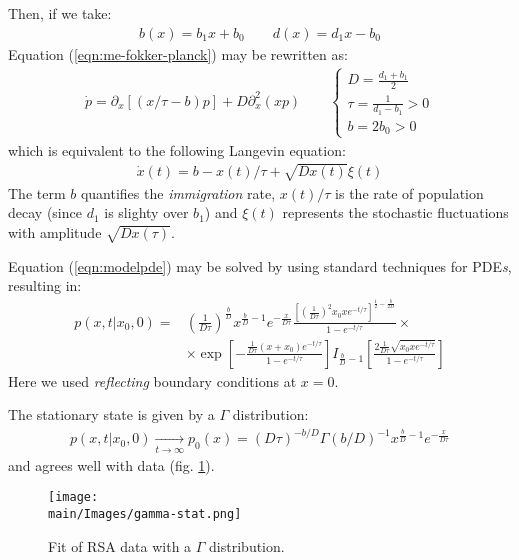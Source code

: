 \documentclass[../../main.tex]{subfiles}
\begin{document}
Then, if we take:
\begin{align*}
    b(x) = b_1 x + b_0\qquad d(x) = d_1 x - b_0
\end{align*}
Equation (\ref{eqn:me-fokker-planck}) may be rewritten as:
\begin{align}\label{eqn:modelpde}
    \dot{p} = \partial_x[(x/\tau - b)p] + D\partial_x^2 (xp) \qquad \begin{cases}
        D = \frac{d_1 + b_1}{2}\\
        \tau = \frac{1}{d_1 - b_1} > 0\\
        b = 2b_0 > 0  
    \end{cases}
\end{align}
which is equivalent to the following Langevin equation:
\begin{align*}
    \dot{x}(t) = b - x(t)/\tau + \sqrt{D x(t)} \xi(t)
\end{align*}
The term $b$ quantifies the \textit{immigration} rate, $x(t)/\tau$ is the rate of population decay (since $d_1$ is slighty over $b_1$) and $\xi(t)$ represents the stochastic fluctuations with amplitude $\sqrt{D x(\tau)}$.

\medskip

Equation (\ref{eqn:modelpde}) may be solved by using standard techniques for PDE\textit{s}, resulting in:
\begin{align*}
    p(x, t | x_{0}, 0) = &\left(\frac{1}{D \tau}\right)^{\frac{b}{D}} x^{\frac{b}{D}-1} e^{-\frac{x}{D \tau}} \frac{\left[\left(\frac{1}{D \tau}\right)^{2} x_{0} x e^{-t / \tau}\right]^{\frac{1}{2}-\frac{b}{2 D}}}{1-e^{-t / \tau}} \times \\
    & \times \exp \left[-\frac{\frac{1}{D \tau}\left(x+x_{0}\right) e^{-t / \tau}}{1-e^{-t / \tau}}\right] I_{\frac{b}{D}-1}\left[\frac{2 \frac{1}{D \tau} \sqrt{x_{0} x e^{-t / \tau}}}{1-e^{-t / \tau}}\right]
\end{align*}
Here we used \textit{reflecting} boundary conditions at $x=0$.

\medskip

The stationary state is given by a $\Gamma$ distribution:
\begin{align*}
    p(x,t|x_0,0) \xrightarrow[t \to \infty]{} p_{0}(x)=(D \tau)^{-b / D} \Gamma(b / D)^{-1} x^{\frac{b}{D}-1} e^{-\frac{x}{D \tau}}
\end{align*}
and agrees well with data (fig. \ref{fig:gamma-stat}).

\begin{figure}[H]
    \centering
    \texttt{[image: \\main/Images/gamma-stat.png]}
    \caption{Fit of RSA data with a $\Gamma$ distribution.}
    \label{fig:gamma-stat}
\end{figure}
\end{document}

